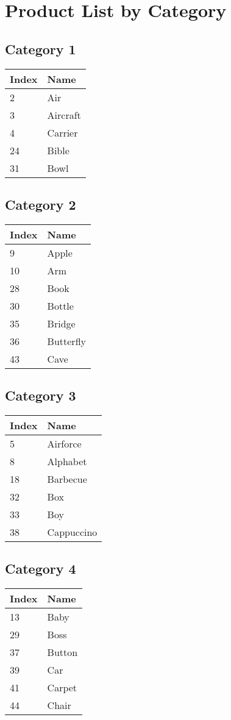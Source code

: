 \documentclass[12pt,a4paper]{article} %
\begin{document}
\section{Product List by Category}
\subsection{Category 1}
\begin{tabular}[c]{ll}
    Index & Name \\
    \hline
            2& Air\\
            3& Aircraft\\
            4& Carrier\\
            24& Bible\\
            31& Bowl\\
    \end{tabular}
\subsection{Category 2}
\begin{tabular}[c]{ll}
    Index & Name \\
    \hline
            9& Apple\\
            10& Arm\\
            28& Book\\
            30& Bottle\\
            35& Bridge\\
            36& Butterfly\\
            43& Cave\\
    \end{tabular}
\subsection{Category 3}
\begin{tabular}[c]{ll}
    Index & Name \\
    \hline
            5& Airforce\\
            8& Alphabet\\
            18& Barbecue\\
            32& Box\\
            33& Boy\\
            38& Cappuccino\\
    \end{tabular}
\subsection{Category 4}
\begin{tabular}[c]{ll}
    Index & Name \\
    \hline
            13& Baby\\
            29& Boss\\
            37& Button\\
            39& Car\\
            41& Carpet\\
            44& Chair\\
    \end{tabular}
\end{document}
